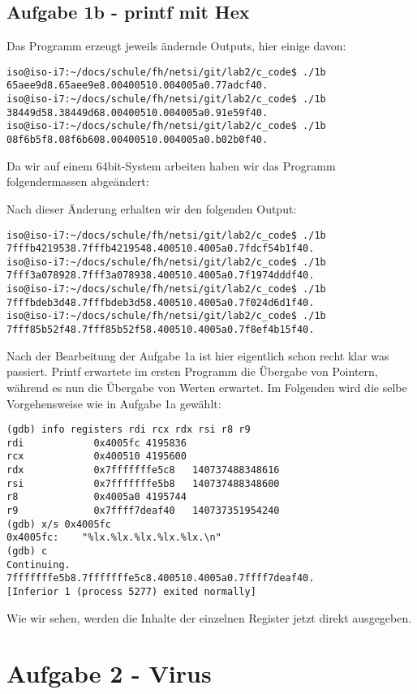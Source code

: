 \documentclass[a4paper,11pt,parskip=half]{scrartcl}
\begin{document}
\subsection{Aufgabe 1b - printf mit Hex}
Das Programm erzeugt jeweils ändernde Outputs, hier einige davon:
\begin{lstlisting}
iso@iso-i7:~/docs/schule/fh/netsi/git/lab2/c_code$ ./1b
65aee9d8.65aee9e8.00400510.004005a0.77adcf40.
iso@iso-i7:~/docs/schule/fh/netsi/git/lab2/c_code$ ./1b
38449d58.38449d68.00400510.004005a0.91e59f40.
iso@iso-i7:~/docs/schule/fh/netsi/git/lab2/c_code$ ./1b
08f6b5f8.08f6b608.00400510.004005a0.b02b0f40.
\end{lstlisting}

Da wir auf einem 64bit-System arbeiten haben wir das Programm folgendermassen abgeändert:


Nach dieser Änderung erhalten wir den folgenden Output:
\begin{lstlisting}
iso@iso-i7:~/docs/schule/fh/netsi/git/lab2/c_code$ ./1b
7fffb4219538.7fffb4219548.400510.4005a0.7fdcf54b1f40.
iso@iso-i7:~/docs/schule/fh/netsi/git/lab2/c_code$ ./1b
7fff3a078928.7fff3a078938.400510.4005a0.7f1974dddf40.
iso@iso-i7:~/docs/schule/fh/netsi/git/lab2/c_code$ ./1b
7fffbdeb3d48.7fffbdeb3d58.400510.4005a0.7f024d6d1f40.
iso@iso-i7:~/docs/schule/fh/netsi/git/lab2/c_code$ ./1b
7fff85b52f48.7fff85b52f58.400510.4005a0.7f8ef4b15f40.
\end{lstlisting}

Nach der Bearbeitung der Aufgabe 1a ist hier eigentlich schon recht klar was passiert. Printf erwartete im ersten Programm die Übergabe von Pointern, während es nun die Übergabe von Werten erwartet. Im Folgenden wird die selbe Vorgehensweise wie in Aufgabe 1a gewählt:
\begin{lstlisting}
(gdb) info registers rdi rcx rdx rsi r8 r9
rdi            0x4005fc	4195836
rcx            0x400510	4195600
rdx            0x7fffffffe5c8	140737488348616
rsi            0x7fffffffe5b8	140737488348600
r8             0x4005a0	4195744
r9             0x7ffff7deaf40	140737351954240
(gdb) x/s 0x4005fc
0x4005fc:	 "%lx.%lx.%lx.%lx.%lx.\n"
(gdb) c
Continuing.
7fffffffe5b8.7fffffffe5c8.400510.4005a0.7ffff7deaf40.
[Inferior 1 (process 5277) exited normally]
\end{lstlisting}

Wie wir sehen, werden die Inhalte der einzelnen Register jetzt direkt ausgegeben.

\section{Aufgabe 2 - Virus}
\end{document}
